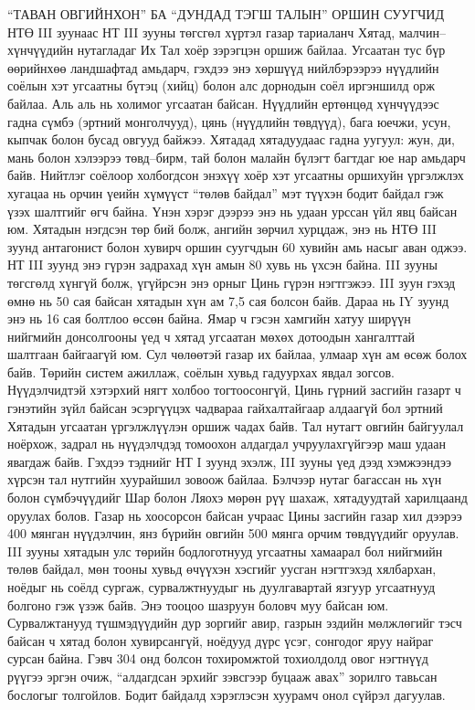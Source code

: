 “ТАВАН ОВГИЙНХОН” БА “ДУНДАД ТЭГШ ТАЛЫН” ОРШИН СУУГЧИД
НТӨ III зуунаас НТ III зууны төгсгөл хүртэл газар тариаланч Хятад, малчин–хүнчүүдийн нутагладаг Их Тал хоёр зэрэгцэн оршиж байлаа. Угсаатан тус бүр өөрийнхөө ландшафтад амьдарч, гэхдээ энэ хөршүүд нийлбэрээрээ нүүдлийн соёлын хэт угсаатны бүтэц (хийц) болон алс дорнодын соёл иргэншилд орж байлаа. Аль аль нь холимог угсаатан байсан. Нүүдлийн ертөнцөд хүнчүүдээс гадна сүмбэ (эртний монголчууд), цянь (нүүдлийн төвдүүд), бага юечжи, усун, кыпчак болон бусад овгууд байжээ. Хятадад хятадуудаас гадна уугуул: жун, ди, мань болон хэлээрээ төвд–бирм, тай болон малайн бүлэгт багтдаг юе нар амьдарч байв.
Нийтлэг соёлоор холбогдсон энэхүү хоёр хэт угсаатны оршихуйн үргэлжлэх хугацаа нь орчин үеийн хүмүүст “төлөв байдал” мэт түүхэн бодит байдал гэж үзэх шалтгийг өгч байна. Үнэн хэрэг дээрээ энэ нь удаан урссан үйл явц байсан юм. Хятадын нэгдсэн төр бий болж, ангийн зөрчил хурцдаж, энэ нь НТӨ III зуунд антагонист болон хувирч оршин суугчдын 60 хувийн амь насыг аван оджээ. НТ III зуунд энэ гүрэн задрахад хүн амын 80 хувь нь үхсэн байна. III зууны төгсгөлд хүнгүй болж, үгүйрсэн энэ орныг Цинь гүрэн нэгтгэжээ. III зуун гэхэд өмнө нь 50 сая байсан хятадын хүн ам 7,5 сая болсон байв. Дараа нь IY зуунд энэ нь 16 сая болтлоо өссөн байна.
Ямар ч гэсэн хамгийн хатуу ширүүн нийгмийн донсолгооны үед ч хятад угсаатан мөхөх дотоодын хангалттай шалтгаан байгаагүй юм. Сул чөлөөтэй газар их байлаа, улмаар хүн ам өсөж болох байв. Төрийн систем ажиллаж, соёлын хувьд гадуурхах явдал зогсов. Нүүдэлчидтэй хэтэрхий нягт холбоо тогтоосонгүй, Цинь гүрний засгийн газарт ч гэнэтийн зүйл байсан эсэргүүцэх чадвараа гайхалтайгаар алдаагүй бол эртний Хятадын угсаатан үргэлжлүүлэн оршиж чадах байв.
Тал нутагт овгийн байгуулал ноёрхож, задрал нь нүүдэлчдэд томоохон алдагдал учруулахгүйгээр маш удаан явагдаж байв. Гэхдээ тэднийг НТ I зуунд эхэлж, III зууны үед дээд хэмжээндээ хүрсэн тал нутгийн хуурайшил зовоож байлаа. Бэлчээр нутаг багассан нь хүн болон сүмбэчүүдийг Шар болон Ляохэ мөрөн рүү шахаж, хятадуудтай харилцаанд оруулах болов. Газар нь хоосорсон байсан учраас Цины засгийн газар хил дээрээ 400 мянган нүүдэлчин, янз бүрийн овгийн 500 мянга орчим төвдүүдийг оруулав. III зууны хятадын улс төрийн бодлоготнууд угсаатны хамаарал бол нийгмийн төлөв байдал, мөн тооны хувьд өчүүхэн хэсгийг уусган нэгтгэхэд хялбархан, ноёдыг нь соёлд сургаж, сурвалжтнуудыг нь дуулгавартай язгуур угсаатнууд болгоно гэж үзэж байв. Энэ тооцоо шазруун боловч муу байсан юм. Сурвалжтанууд түшмэдүүдийн дур зоргийг авир, газрын эздийн мөлжлөгийг тэсч байсан ч хятад болон хувирсангүй, ноёдууд дүрс үсэг, сонгодог яруу найраг сурсан байна. Гэвч 304 онд болсон тохиромжтой тохиолдолд овог нэгтнүүд рүүгээ эргэн очиж, “алдагдсан эрхийг зэвсгээр буцааж авах” зорилго тавьсан бослогыг толгойлов. Бодит байдалд хэрэглэсэн хуурамч онол сүйрэл дагуулав.
